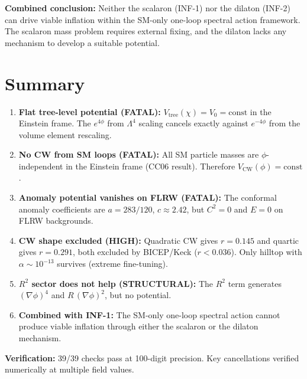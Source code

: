 \documentclass[11pt,a4paper]{article}
\theoremstyle{plain}
\theoremstyle{definition}
\begin{document}
\textbf{Combined conclusion:} Neither the scalaron (INF-1) nor the
dilaton (INF-2) can drive viable inflation within the SM-only one-loop
spectral action framework.  The scalaron mass problem requires
external fixing, and the dilaton lacks any mechanism to develop a
suitable potential.

\section{Summary}\label{sec:summary}

\begin{tcolorbox}[colback=red!5!white, colframe=red!50!black,
  title={\textbf{INF-2 Main Results --- NEGATIVE}}]
\begin{enumerate}[nosep]
  \item \textbf{Flat tree-level potential (FATAL):}
    $V_{\mathrm{tree}}(\chi) = V_0 = \mathrm{const}$ in the
    Einstein frame.  The $e^{4\phi}$ from $\Lambda^4$ scaling
    cancels exactly against $e^{-4\phi}$ from the volume element
    rescaling.

  \item \textbf{No CW from SM loops (FATAL):}
    All SM particle masses are $\phi$-independent in the Einstein
    frame (CC06 result).  Therefore $V_{\mathrm{CW}}(\phi) = \mathrm{const}$.

  \item \textbf{Anomaly potential vanishes on FLRW (FATAL):}
    The conformal anomaly coefficients are $a = 283/120$,
    $c \approx 2.42$, but $C^2 = 0$ and $E = 0$ on FLRW backgrounds.

  \item \textbf{CW shape excluded (HIGH):}
    Quadratic CW gives $r = 0.145$ and quartic gives $r = 0.291$,
    both excluded by BICEP/Keck ($r < 0.036$).  Only hilltop with
    $\alpha \sim 10^{-13}$ survives (extreme fine-tuning).

  \item \textbf{$R^2$ sector does not help (STRUCTURAL):}
    The $R^2$ term generates $(\nabla\phi)^4$ and
    $R\,(\nabla\phi)^2$, but no potential.

  \item \textbf{Combined with INF-1:}
    The SM-only one-loop spectral action cannot produce viable
    inflation through either the scalaron or the dilaton mechanism.
\end{enumerate}

\medskip
\noindent\textbf{Verification:} 39/39 checks pass at 100-digit
precision.  Key cancellations verified numerically at multiple field
values.
\end{tcolorbox}
\end{document}
